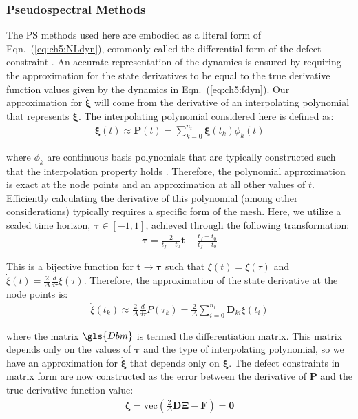 \subsubsection{Pseudospectral Methods}
The PS methods used here are embodied as a literal form of Eqn.~(\ref{eq:ch5:NLdyn}), commonly called the differential form of the defect constraint \cite{Francolin2014a}.
An accurate representation of the dynamics is ensured by requiring the approximation for the state derivatives to be equal to the true derivative function values given by the dynamics in Eqn.~(\ref{eq:ch5:fdyn}).
Our approximation for $\dot{\bm{\xi}}$ will come from the derivative of an interpolating polynomial that represents $\bm{\xi}$.
The interpolating polynomial considered here is defined as:
\begin{align}\label{eq:ch5:basis}
\bm{\xi}(t) \approx \bm{P}(t) = \sum_{k=0}^{n_t} \bm{\xi}(t_k) \phi_k(t)
\end{align}

\noindent where $\phi_k$ are continuous basis polynomials that are typically constructed such that the interpolation property holds \cite{Becerra2015a}.
Therefore, the polynomial approximation is exact at the node points and an approximation at all other values of $t$.
Efficiently calculating the derivative of this polynomial (among other considerations) typically requires a specific form of the mesh.
Here, we utilize a scaled time horizon, $\bm{\tau} \in [-1,1]$, achieved through the following transformation:
\begin{align}
\bm{\tau} = \frac{2}{t_{f} - t_0} \bm{t} - \frac{t_{f} + t_0}{t_{f} - t_0} 
\end{align}

\noindent This is a bijective function for $\bm{t} \to \bm{\tau}$ such that $\xi(t) = \xi(\tau)$ and $\dot{\xi}(t) = \frac{2}{\Delta} \frac{d}{d\tau}{\xi}(\tau)$. Therefore, the approximation of the state derivative at the node points is:
\begin{align} \label{eq:ch5:ps:state:approx}
\dot{\xi}(t_k) \approx \frac{2}{\Delta} \frac{d}{d\tau}{P}(\tau_k) = \frac{2}{\Delta} \sum_{i=0}^{n_t} \bm{D}_{ki} \xi(t_i)
\end{align}

\noindent where the matrix $\gls{Dbm}$ is termed the differentiation matrix.
This matrix depends only on the values of $\bm{\tau}$ and the type of interpolating polynomial, so we have an approximation for $\dot{\bm{\xi}}$ that depends only on $\bm{\xi}$.
The defect constraints in matrix form are now constructed as the error between the derivative of $\bm{P}$ and the true derivative function value:
\begin{align}\label{eq:ch5:defect:PS}
\bm{\zeta}  =  \mathrm{vec}\left( \frac{2}{\Delta}\bm{D} \bm{\Xi} - \bm{F} \right) = \bm{0}
\end{align}

